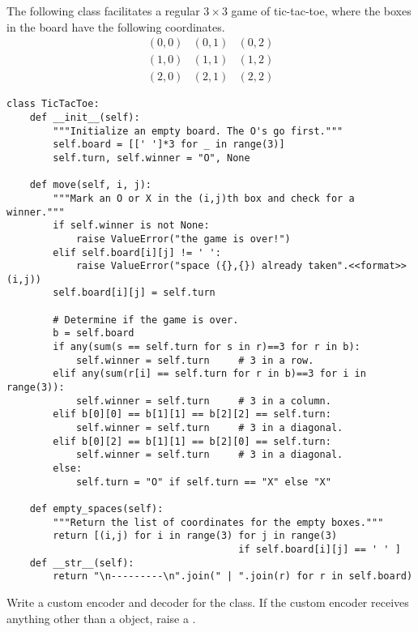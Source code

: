 The following class facilitates a regular $3\times 3$ game of tic-tac-toe, where the boxes in the board have the following coordinates.
\[
\begin{array}{c|c|c}
(0,0) & (0,1) & (0,2) \\ \hline
(1,0) & (1,1) & (1,2) \\ \hline
(2,0) & (2,1) & (2,2)
\end{array}
\]
\begin{lstlisting}
class TicTacToe:
    def __init__(self):
        """Initialize an empty board. The O's go first."""
        self.board = [[' ']*3 for _ in range(3)]
        self.turn, self.winner = "O", None

    def move(self, i, j):
        """Mark an O or X in the (i,j)th box and check for a winner."""
        if self.winner is not None:
            raise ValueError("the game is over!")
        elif self.board[i][j] != ' ':
            raise ValueError("space ({},{}) already taken".<<format>>(i,j))
        self.board[i][j] = self.turn

        # Determine if the game is over.
        b = self.board
        if any(sum(s == self.turn for s in r)==3 for r in b):
            self.winner = self.turn     # 3 in a row.
        elif any(sum(r[i] == self.turn for r in b)==3 for i in range(3)):
            self.winner = self.turn     # 3 in a column.
        elif b[0][0] == b[1][1] == b[2][2] == self.turn:
            self.winner = self.turn     # 3 in a diagonal.
        elif b[0][2] == b[1][1] == b[2][0] == self.turn:
            self.winner = self.turn     # 3 in a diagonal.
        else:
            self.turn = "O" if self.turn == "X" else "X"

    def empty_spaces(self):
        """Return the list of coordinates for the empty boxes."""
        return [(i,j) for i in range(3) for j in range(3)
                                        if self.board[i][j] == ' ' ]
    def __str__(self):
        return "\n---------\n".join(" | ".join(r) for r in self.board)
\end{lstlisting}

Write a custom encoder and decoder for the  class.
If the custom encoder receives anything other than a  object, raise a .
\label{prob:tictactoe-serialization}

